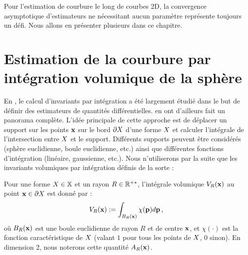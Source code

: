 Pour l'estimation de courbure le long de courbes 2D, la convergence asymptotique
d'estimateurs ne nécessitant aucun paramètre représente toujours un défi. Nous
allons en présenter plusieurs dans ce chapitre.
%
%
\section{Estimation de la courbure par intégration volumique de la sphère}
\label{sec:estimators:volume}
%
En \GeometryProcessing, le calcul d'invariants par intégration a été largement
étudié dans le but de définir des estimateurs de quantités différentielles.
 en ont d'ailleurs fait un
panorama complète. L'idée principale de cette approche est de déplacer un support
sur les points $\mathbf{x}$ sur le bord $\partial X$ d'une forme $X$ et calculer
l'intégrale de l'intersection entre $X$ et le support. Différents supports
peuvent être considérés (sphère euclidienne, boule euclidienne, etc.) ainsi que
différentes fonctions d'intégration (linéaire, gaussienne, etc.). Nous
n'utiliserons par la suite que les invariants volumiques par intégration définis
de la sorte :
%
\begin{definition}
  \label{def:Volume}
  Pour une forme $X \in \mathbb{X}$ et un rayon $R \in \mathbb{R}^{+*}$, l'intégrale
  volumique $V_R(\mathbf{x})$ au point $\mathbf{x} \in \partial X$ est donné par :
  \begin{equation}
    V_R(\mathbf{x}) := \int_{B_{R}(\mathbf{x})} \chi(\mathbf{p})d\mathbf{p}\,,
  \end{equation}
  où $B_{R}(\mathbf{x})$ est une boule euclidienne de rayon $R$ et de centre $\mathbf{x}$,
  et $\chi(\cdot)$ est la fonction caractéristique de $X$ (valant $1$ pour
  tous les points de $X$, $0$ sinon). En dimension 2, nous noterons cette
  quantité $A_R(\mathbf{x})$.
\end{definition}
%
